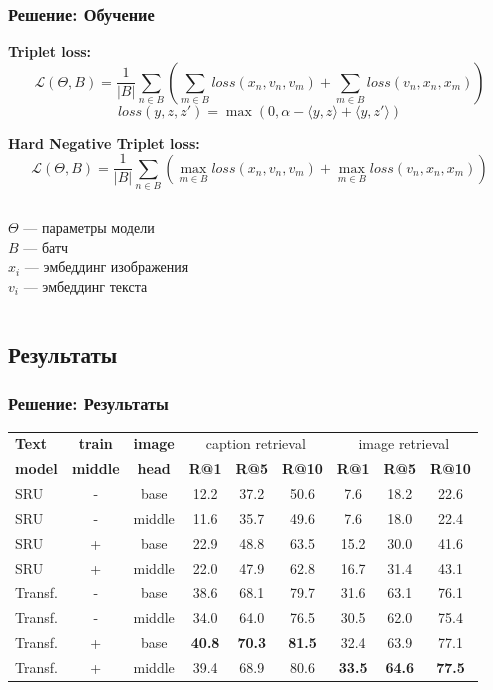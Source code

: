 \documentclass{beamer}
\begin{document}
\begin{frame}
	\frametitle{Решение: Обучение}	
	\textbf{Triplet loss:}
	$$\mathcal{L}(\Theta, B) = \frac{1}{|B|} \sum_{n \in B} \left( \sum_{m \in B} loss(x_n, v_n, v_m) + \sum_{m \in B} loss(v_n, x_n, x_m) \right)$$
	$$loss(y, z, z') = \max(0, \alpha - \langle y, z \rangle + \langle y, z' \rangle)$$
	
	\textbf{Hard Negative Triplet loss:}
	$$\mathcal{L}(\Theta, B) = \frac{1}{|B|} \sum_{n \in B} \left( \max_{m \in B} loss(x_n, v_n, v_m) + \max_{m \in B} loss(v_n, x_n, x_m) \right)$$
	
	\begin{columns}[c]
		$\Theta$ --- параметры модели\\
		$B$ --- батч\\
		
		$x_i$ --- эмбеддинг изображения\\
		$v_i$ --- эмбеддинг текста\\
	\end{columns}
\end{frame}

\subsection{Результаты}

\begin{frame}
	\frametitle{Решение: Результаты}
	\begin{table}
		\begin{tabular}{l c c c c c c c c}
			\toprule
			\textbf{Text} & \textbf{train} & \textbf{image} & \multicolumn{3}{c}{caption retrieval} & \multicolumn{3}{c}{image retrieval} \\
			\textbf{model} & \textbf{middle} & \textbf{head} & \textbf{R@1} & \textbf{R@5} & \textbf{R@10} & \textbf{R@1} & \textbf{R@5} & \textbf{R@10}\\
			\midrule
			SRU     & - & base   & 12.2 & 37.2 & 50.6 &  7.6 & 18.2 & 22.6\\ 
			SRU     & - & middle & 11.6 & 35.7 & 49.6 &  7.6 & 18.0 & 22.4\\ 
			SRU     & + & base   & 22.9 & 48.8 & 63.5 & 15.2 & 30.0 & 41.6\\
			SRU     & + & middle & 22.0 & 47.9 & 62.8 & 16.7 & 31.4 & 43.1\\ 
			Transf. & - & base   & 38.6 & 68.1 & 79.7 & 31.6 & 63.1 & 76.1\\
			Transf. & - & middle & 34.0 & 64.0 & 76.5 & 30.5 & 62.0 & 75.4\\
			Transf. & + & base   & \textbf{40.8} & \textbf{70.3} & \textbf{81.5} & 32.4 & 63.9 & 77.1\\
			Transf. & + & middle & 39.4 & 68.9 & 80.6 & \textbf{33.5} & \textbf{64.6} & \textbf{77.5}\\
			\bottomrule
		\end{tabular}
	\end{table}
\end{frame}
\end{document}
